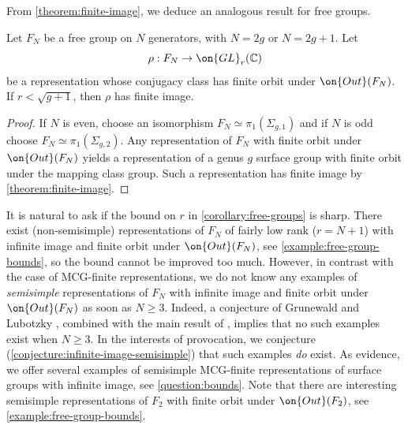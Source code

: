 From \autoref{theorem:finite-image}, we deduce an analogous result for free groups.
\begin{corollary}
\notready\label{corollary:free-groups}
	Let $F_N$ be a free group on $N$ generators, with $N=2g$ or $N=2g+1$.
	Let $$\rho: F_N\to \on{GL}_r(\mathbb{C})$$ be a representation whose conjugacy class has finite orbit under $\on{Out}(F_N)$. If $r<\sqrt{g+1}$, then $\rho$ has finite image.
\end{corollary}
\begin{proof}
	If $N$ is even, choose an isomorphism $F_N\simeq \pi_1(\Sigma_{g,1})$
	and if $N$ is odd choose $F_N\simeq \pi_1(\Sigma_{g,2})$. Any
	representation of $F_N$ with finite orbit under $\on{Out}(F_N)$ yields a
	representation of a genus $g$ surface group with finite orbit under the
	mapping class group. Such a representation has finite image by \autoref{theorem:finite-image}.
\end{proof}
\begin{remark}
\notready
It is natural to ask if the bound on $r$ in \autoref{corollary:free-groups} is sharp.
There exist (non-semisimple) representations of $F_N$ of fairly low rank ($r =N + 1$) with infinite image and finite orbit under $\on{Out}(F_N)$, see
\autoref{example:free-group-bounds}, so the bound cannot be improved too much.
However, in contrast with the case of MCG-finite representations, we do not know any examples of \emph{semisimple} representations of $F_N$ with infinite image and finite orbit under $\on{Out}(F_N)$ as soon as $N\geq 3$.
Indeed, a conjecture of Grunewald and Lubotzky \cite[Conjecture in
\S9.2]{grunewald2009linear}, combined with the main result of
\cite{farb2017moving}, implies that no such examples exist when $N \geq 3$. In the interests of provocation, we conjecture
(\autoref{conjecture:infinite-image-semisimple})
that such examples \emph{do} exist.
As evidence, we offer several examples of semisimple MCG-finite representations of surface groups with infinite image, see \autoref{question:bounds}. Note that there are interesting semisimple representations of $F_2$ with finite orbit under $\on{Out}(F_2)$, see \autoref{example:free-group-bounds}.
\end{remark}

